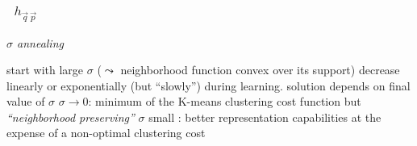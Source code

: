 \begin{frame}[t] \frametitle{\subsecname~$h_{\vec{q} \, \vec{p}}$} 
\emph{$\sigma$ annealing}
\begin{itemize}
      \itr start with large
        $\sigma$  ($\leadsto$ neighborhood function convex over
        its support)
      \itr decrease linearly or exponentially (but
        ``slowly'') during learning.
       \itr solution depends on 
        final value of $\sigma$
        \vspace{0.5cm}
       \itr $\sigma \rightarrow 0$: minimum of the K-means clustering cost function but 
            \emph{``neighborhood preserving''}  \itr $\sigma$ small : better representation capabilities at the expense of a non-optimal clustering cost 
\end{itemize}


\end{frame}


